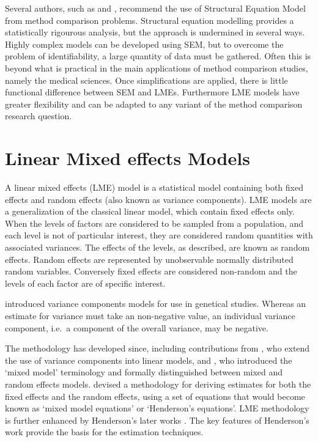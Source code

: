 \documentclass[12pt, a4paper]{report}
\theoremstyle{plain}
\theoremstyle{definition}
\theoremstyle{remark}
\begin{document}
Several authors, such as \citet{gkelly1985} and \citet{voelkel2005center}, recommend the use of Structural Equation Model from method comparison problems.
Structural equation modelling provides a statistically rigourous analysis, but the approach is undermined in several ways.  Highly complex models can be developed using SEM, but to overcome the problem of identifiability, a large quantity of data must be gathered. Often this is beyond what is practical in the main applications of method comparison studies, namely the medical sciences.  Once simplifications are applied, there is little functional difference between SEM and LMEs.
Furthermore LME models have greater flexibility and can be adapted to any variant of the method comparison research question.

			\section{Linear Mixed effects Models}
			A linear mixed effects (LME) model is a statistical model containing both fixed effects and random effects (also known as variance components). LME models are a generalization of the classical linear model, which contain fixed effects only. When the levels of factors are considered to be sampled from a population,
			and each level is not of particular interest, they are considered random quantities with associated variances.
			The effects of the levels, as described, are known as random effects. Random effects are represented by unobservable
			normally distributed random variables. Conversely fixed effects are considered non-random and the
			levels of each factor are of specific interest.
			
			\citet{Fisher4} introduced variance components models for use in genetical studies. Whereas an estimate for variance must take an non-negative value, an individual variance component, i.e.\ a component of the overall variance, may be negative.
			
			The methodology has developed since, including contributions from
			\citet{tippett}, who extend the use of variance components into linear models, and \citet{eisenhart}, who introduced the `mixed model' terminology and formally distinguished between mixed and random effects models. \citet{Henderson:1950} devised a methodology for deriving estimates for both the fixed effects and the random effects, using a set of equations that would become known as `mixed model equations' or `Henderson's equations'.
			LME methodology is further enhanced by Henderson's later works \citep{Henderson53, Henderson59,Henderson63,Henderson73,Henderson84a}. The key features of Henderson's work provide the basis for the estimation techniques.
			
\end{document}
